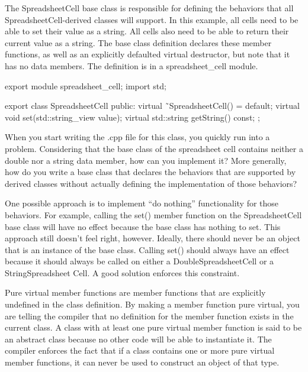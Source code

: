 
The SpreadsheetCell base class is responsible for defining the behaviors that all SpreadsheetCell-derived classes will support. In this example, all cells need to be able to set their value as a string. All cells also need to be able to return their current value as a string. The base class definition declares these member functions, as well as an explicitly defaulted virtual destructor, but note that it has no data members. The definition is in a spreadsheet\_cell module.

\begin{cpp}
export module spreadsheet_cell;
import std;

export class SpreadsheetCell
{
    public:
        virtual ˜SpreadsheetCell() = default;
        virtual void set(std::string_view value);
        virtual std::string getString() const;
};
\end{cpp}

When you start writing the .cpp file for this class, you quickly run into a problem. Considering that the base class of the spreadsheet cell contains neither a double nor a string data member, how can you implement it? More generally, how do you write a base class that declares the behaviors that are supported by derived classes without actually defining the implementation of those behaviors?

One possible approach is to implement “do nothing” functionality for those behaviors. For example, calling the set() member function on the SpreadsheetCell base class will have no effect because the base class has nothing to set. This approach still doesn’t feel right, however. Ideally, there should never be an object that is an instance of the base class. Calling set() should always have an effect because it should always be called on either a DoubleSpreadsheetCell or a StringSpreadsheet Cell. A good solution enforces this constraint.


Pure virtual member functions are member functions that are explicitly undefined in the class definition. By making a member function pure virtual, you are telling the compiler that no definition for the member function exists in the current class. A class with at least one pure virtual member function is said to be an abstract class because no other code will be able to instantiate it. The compiler enforces the fact that if a class contains one or more pure virtual member functions, it can never be used to construct an object of that type.


